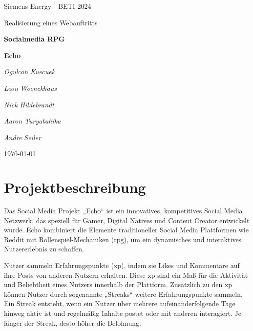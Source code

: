 \documentclass[a4paper,12pt]{article}
\begin{document}
\begin{titlepage}
	\centering
	{\LARGE Siemens Energy - BETI 2024 \par}
	\vspace{0.5cm}
	{\Large Realisierung eines Webauftritts \par}
	\vspace{3.5cm}
	{\huge\bfseries Socialmedia RPG \par}
	{\huge\bfseries Echo \par}
	\vspace{3cm}
	{\Large\itshape Ogulcan Kuecuek \par}
	{\Large\itshape Leon Woenckhaus \par}
	{\Large\itshape Nick Hildebrandt \par}
	{\Large\itshape Aaron Turyabahika \par}
	{\Large\itshape Andre Seiler \par}
	\vfill
	{\large \today\par}
\end{titlepage}
\newpage

\tableofcontents
\newpage

\listoffigures
\newpage

\printglossary[type=\acronymtype, title=Abkürzungsverzeichnis]
\newpage

\setcounter{page}{1}

\section{Projektbeschreibung}
Das Social Media Projekt „Echo“ ist ein innovatives, kompetitives Social Media
Netzwerk, das speziell für Gamer, Digital Natives und Content Creator
entwickelt wurde. Echo kombiniert die Elemente traditioneller Social Media
Plattformen wie Reddit mit Rollenspiel-Mechaniken (\gls{rpg}), um ein
dynamisches und interaktives Nutzererlebnis zu schaffen.

Nutzer sammeln Erfahrungspunkte (\gls{xp}), indem sie Likes und Kommentare auf
ihre Posts von anderen Nutzern erhalten. Diese \gls{xp} sind ein Maß für die
Aktivität und Beliebtheit eines Nutzers innerhalb der Plattform. Zusätzlich zu
den \gls{xp} können Nutzer durch sogenannte „Streaks“ weitere Erfahrungspunkte
sammeln. Ein Streak entsteht, wenn ein Nutzer über mehrere aufeinanderfolgende
Tage hinweg aktiv ist und regelmäßig Inhalte postet oder mit anderen
interagiert. Je länger der Streak, desto höher die Belohnung.
\end{document}
